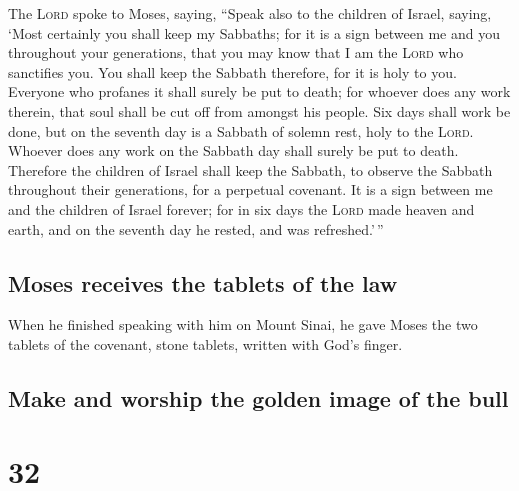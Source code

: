  The \textsc{Lord} spoke to Moses, saying,
 ``Speak also to the children of Israel, saying, `Most
certainly you shall keep my Sabbaths; for it is a sign between me and
you throughout your generations, that you may know that I am the
\textsc{Lord} who sanctifies you.  You shall keep the
Sabbath therefore, for it is holy to you. Everyone who profanes it shall
surely be put to death; for whoever does any work therein, that soul
shall be cut off from amongst his people.  Six days shall
work be done, but on the seventh day is a Sabbath of solemn rest, holy
to the \textsc{Lord}. Whoever does any work on the Sabbath day shall
surely be put to death.  Therefore the children of Israel
shall keep the Sabbath, to observe the Sabbath throughout their
generations, for a perpetual covenant.  It is a sign
between me and the children of Israel forever; for in six days the
\textsc{Lord} made heaven and earth, and on the seventh day he rested,
and was refreshed.'\,''

\hypertarget{moses-receives-the-tablets-of-the-law}{%
\subsection{Moses receives the tablets of the
law}\label{moses-receives-the-tablets-of-the-law}}

 When he finished speaking with him on Mount Sinai, he
gave Moses the two tablets of the covenant, stone tablets, written with
God's finger.

\hypertarget{make-and-worship-the-golden-image-of-the-bull}{%
\subsection{Make and worship the golden image of the
bull}\label{make-and-worship-the-golden-image-of-the-bull}}

\hypertarget{section-31}{%
\section{32}\label{section-31}}


